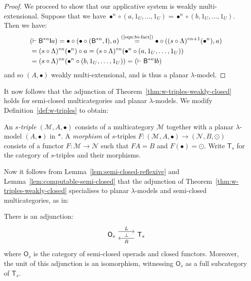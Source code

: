 \documentclass{llncs}
\begin{document}
\begin{proof}
We proceed to show that our applicative system is weakly multi-extensional. Suppose that we have $\bullet^n \circ (a,1_U,\ldots,1_U) = \bullet^n \circ (b,1_U,\ldots,1_U)$. Then we have:
\begin{align*}
  & (\vdash \mathsf{B}^{*n}\mathsf{I}a)
    = \bullet \circ (\bullet \circ (\mathsf{B}^{*n},\mathsf{I}),a)
    \overset{\text{(\ref{eqn:bi-fact})}}{=} \bullet \circ ((s \circ \Lambda)^{\circ n+1}(\bullet^n),a)
  \\&= (s \circ \Lambda)^{\circ n}(\bullet^n) \circ a
  = (s \circ \Lambda)^{\circ n}(\bullet^n \circ (a,1_U,\ldots,1_U))
  \\&= (s \circ \Lambda)^{\circ n}(\bullet^n \circ (b,1_U,\ldots,1_U))
  = (\vdash \mathsf{B}^{*n}\mathsf{I}b)
\end{align*}
and so $(A,\bullet)$ weakly multi-extensional, and is thus a planar $\lambda$-model.
\end{proof}

It now follows that the adjunction of Theorem~\ref{thm:w-triples-weakly-closed} holds for semi-closed multicategories and planar $\lambda$-models. We modify Definition~\ref{def:w-triples} to obtain:
\begin{definition}\label{def:s-triples}
  An \emph{$s$-triple} $(\mathcal{M},A,\bullet)$ consists of a multicategory $\mathcal{M}$ together with a planar $\lambda$-model $(A,\bullet)$ in $\mathcal{*}$. A \emph{morphism} of $s$-triples $F : (\mathcal{M},A,\bullet) \to (\mathcal{N},B,\odot)$ consists of a functor $F : \mathcal{M} \to \mathcal{N}$ such that $FA = B$ and $F(\bullet) = \odot$. Write $\mathsf{T}_s$ for the category of $s$-triples and their morphisms.
\end{definition}
Now it follows from Lemma~\ref{lem:semi-closed-reflexive} and Lemma~\ref{lem:computable-semi-closed} that the adjunction of Theorem~\ref{thm:w-triples-weakly-closed} specialises to planar $\lambda$-models and semi-closed multicategories, as in:
\begin{theorem}\label{thm:s-triples-semi-closed}
    There is an adjunction:
    \[
    \begin{tikzcd}
      \mathsf{O}_s \ar[r,phantom,"{\scriptstyle \perp}"] \ar[r,"L", shift left=0.5em] & \mathsf{T}_s \ar[l,"R", shift left=0.5em]
    \end{tikzcd}
  \]
  where $\mathsf{O}_s$ is the category of semi-closed operads and closed functors. Moreover, the unit of this adjunction is an isomorphism, witnessing $\mathsf{O}_s$ as a full subcategory of $\mathsf{T}_s$.
\end{theorem}
\end{document}
